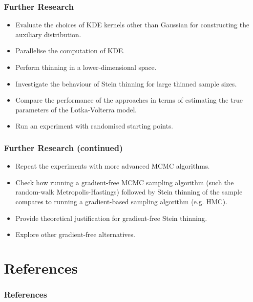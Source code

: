 \documentclass{beamer}
\begin{document}
\begin{frame}
\frametitle{Further Research}
\begin{itemize}

\item Evaluate the choices of KDE kernels other than Gaussian for constructing the auxiliary distribution.

\item Parallelise the computation of KDE.

\item Perform thinning in a lower-dimensional space.

\item Investigate the behaviour of Stein thinning for large thinned sample sizes.

\item Compare the performance of the approaches in terms of estimating the true parameters of the Lotka-Volterra model.

\item Run an experiment with randomised starting points.

\end{itemize}

\end{frame}

\begin{frame}
\frametitle{Further Research (continued)}

\begin{itemize}

\item Repeat the experiments with more advanced MCMC algorithms. 

\item Check how running a gradient-free MCMC sampling algorithm (such the random-walk Metropolis-Hastings) followed by Stein thinning of the sample compares to running a gradient-based sampling algorithm (e.g. HMC).

\item Provide theoretical justification for gradient-free Stein thinning.

\item Explore other gradient-free alternatives.

\end{itemize}

\end{frame}

\section{References}

\begin{frame}[allowframebreaks]
\frametitle{References}

\fontsize{10pt}{12}\selectfont




\end{frame}
\end{document}
